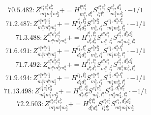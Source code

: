 \documentclass[letterpaper,10pt,fleqn,leqno,onecolumn]{article}
\begin{document}
\begin{equation} \;\;\;\;\;\;  70.5.482: Z^{e_{1}^{a}e_{1}^{b}e_{2}^{b}}_{m_{1}^{a}m_{1}^{b}m_{2}^{b}}+=H^{l_{1}^{a}l_{1}^{b}}_{m_{1}^{a},d_{1}^{b}}S^{e_{1}^{a}e_{1}^{b}}_{l_{1}^{a}l_{1}^{b}}S^{e_{2}^{b},d_{1}^{b}}_{m_{1}^{b}m_{2}^{b}}\cdot -1/1 \end{equation}
\begin{equation} \;\;\;\;\;\;  71.2.487: Z^{e_{1}^{a}e_{1}^{b}e_{2}^{b}}_{m_{1}^{a}m_{1}^{b}m_{2}^{b}}+=H^{l_{1}^{b},l_{2}^{b}}_{d_{1}^{b}d_{2}^{b}}S^{e_{1}^{b}e_{2}^{b}}_{m_{1}^{b},l_{1}^{b}}S^{e_{1}^{a},d_{1}^{b}d_{2}^{b}}_{m_{1}^{a}m_{2}^{b},l_{2}^{b}}\cdot -1/1 \end{equation}
\begin{equation} \;\;\;\;\;\;  71.3.488: Z^{e_{1}^{a}e_{1}^{b}e_{2}^{b}}_{m_{1}^{a}m_{1}^{b}m_{2}^{b}}+=H^{l_{1}^{b},l_{2}^{b}}_{d_{1}^{b}d_{2}^{b}}S^{e_{1}^{a}e_{1}^{b}}_{m_{1}^{a},l_{1}^{b}}S^{e_{2}^{b},d_{1}^{b}d_{2}^{b}}_{m_{1}^{b}m_{2}^{b},l_{2}^{b}} \end{equation}
\begin{equation} \;\;\;\;\;\;  71.6.491: Z^{e_{1}^{a}e_{1}^{b}e_{2}^{b}}_{m_{1}^{a}m_{1}^{b}m_{2}^{b}}+=H^{l_{1}^{b},l_{1}^{a}}_{d_{1}^{a}d_{1}^{b}}S^{e_{1}^{b}e_{2}^{b}}_{m_{1}^{b},l_{1}^{b}}S^{e_{1}^{a},d_{1}^{a}d_{1}^{b}}_{m_{1}^{a}m_{2}^{b},l_{1}^{a}}\cdot -1/1 \end{equation}
\begin{equation} \;\;\;\;\;\;  71.7.492: Z^{e_{1}^{a}e_{1}^{b}e_{2}^{b}}_{m_{1}^{a}m_{1}^{b}m_{2}^{b}}+=H^{l_{1}^{b},l_{1}^{a}}_{d_{1}^{a}d_{1}^{b}}S^{e_{1}^{a}e_{1}^{b}}_{m_{1}^{a},l_{1}^{b}}S^{e_{2}^{b},d_{1}^{a}d_{1}^{b}}_{m_{1}^{b}m_{2}^{b},l_{1}^{a}} \end{equation}
\begin{equation} \;\;\;\;\;\;  71.9.494: Z^{e_{1}^{a}e_{1}^{b}e_{2}^{b}}_{m_{1}^{a}m_{1}^{b}m_{2}^{b}}+=H^{l_{1}^{a},l_{1}^{b}}_{d_{1}^{a}d_{1}^{b}}S^{e_{1}^{a}e_{1}^{b}}_{m_{1}^{b},l_{1}^{a}}S^{e_{2}^{b},d_{1}^{a}d_{1}^{b}}_{m_{1}^{a}m_{2}^{b},l_{1}^{b}}\cdot -1/1 \end{equation}
\begin{equation} \;\;\;\;\;\;  71.13.498: Z^{e_{1}^{a}e_{1}^{b}e_{2}^{b}}_{m_{1}^{a}m_{1}^{b}m_{2}^{b}}+=H^{l_{1}^{a},l_{2}^{a}}_{d_{1}^{a}d_{2}^{a}}S^{e_{1}^{a}e_{1}^{b}}_{m_{1}^{b},l_{1}^{a}}S^{e_{2}^{b},d_{1}^{a}d_{2}^{a}}_{m_{1}^{a}m_{2}^{b},l_{2}^{a}}\cdot -1/1 \end{equation}
\begin{equation} \;\;\;\;\;\;  72.2.503: Z^{e_{1}^{a}e_{1}^{b}e_{2}^{b}}_{m_{1}^{a}m_{1}^{b}m_{2}^{b}}+=H^{l_{1}^{b}l_{2}^{b}}_{d_{1}^{b}d_{2}^{b}}S^{e_{1}^{b}e_{2}^{b}}_{l_{1}^{b}l_{2}^{b}}S^{e_{1}^{a},d_{1}^{b}d_{2}^{b}}_{m_{1}^{a}m_{1}^{b}m_{2}^{b}} \end{equation}
\end{document}
